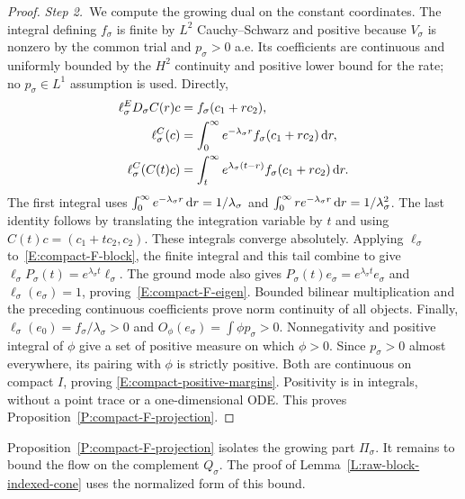 \begin{proof}
  \medskip
  \noindent\textit{Step 2.~}We compute the growing dual on the constant
  coordinates.
  The integral defining $f_\sigma$ is finite by $L^2$ Cauchy--Schwarz and
  positive because $V_\sigma$ is nonzero by the common trial and $p_\sigma > 0$
  a.e. Its coefficients are continuous and uniformly bounded by the $H^2$
  continuity and positive lower bound for the rate; no $p_\sigma \in L^1$
  assumption is used. Directly,
  \begin{align*}
    \ell_\sigma^ED_\sigma C(r)c&=f_\sigma(c_1+rc_2),\\
    \ell_\sigma^C(c)
    &=\int_0^\infty e^{-\lambda_\sigma r}
    f_\sigma(c_1+rc_2)\,\mathrm{d} r,\\
    \ell_\sigma^C(C(t)c)
    &=\int_t^\infty e^{\lambda_\sigma(t-r)}
    f_\sigma(c_1+rc_2)\,\mathrm{d} r.
  \end{align*}
  The first integral uses $\int_0^\infty e^{-\lambda_\sigma r}\,\mathrm{d} r =
  1/\lambda_\sigma$ and $\int_0^\infty r e^{-\lambda_\sigma r}\,\mathrm{d} r =
  1/\lambda_\sigma^2$. The last identity follows by translating the
  integration variable by $t$ and using $C(t)c = (c_1+tc_2,c_2)$.
  These integrals converge absolutely. Applying $\ell_\sigma$
  to~\eqref{E:compact-F-block}, the finite integral and this tail combine to
  give $\ell_\sigma P_\sigma(t) = e^{\lambda_\sigma t}\ell_\sigma$. The ground
  mode also gives $P_\sigma(t)e_\sigma = e^{\lambda_\sigma t}e_\sigma$ and
  $\ell_\sigma(e_\sigma) = 1$, proving~\eqref{E:compact-F-eigen}. Bounded
  bilinear multiplication and the preceding continuous coefficients prove norm
  continuity of all objects. Finally, $\ell_\sigma(e_0) =
  f_\sigma/\lambda_\sigma > 0$ and $O_\phi(e_\sigma) = \int\phi p_\sigma > 0$.
  Nonnegativity and positive integral of $\phi$ give a set of positive measure
  on which $\phi > 0$. Since $p_\sigma > 0$ almost everywhere, its pairing
  with $\phi$ is strictly positive.
  Both are continuous on compact $I$, proving
  \eqref{E:compact-positive-margins}. Positivity is in integrals, without a
  point trace or a one-dimensional ODE. This proves
  Proposition~\ref{P:compact-F-projection}.
\end{proof}

Proposition~\ref{P:compact-F-projection} isolates the growing part
$\Pi_\sigma$. It remains to bound the flow on the complement $Q_\sigma$. The
proof of Lemma~\ref{L:raw-block-indexed-cone} uses the normalized form of this
bound.

